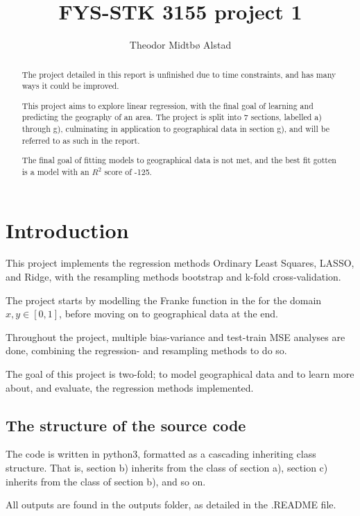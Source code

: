 \documentclass[a4paper, UKenglish]{article}
\newcommand{\0}{\mathbf{0}}
\newcommand{\1}{\mathbf{1}}
\begin{document}
\title{FYS-STK 3155 project 1}
\author{Theodor Midtbø Alstad}
\maketitle

\begin{abstract}
The project detailed in this report is unfinished due to time constraints, and has many ways it could be improved.

This project aims to explore linear regression, with the final goal of learning and predicting the geography of an area. The project is split into 7 sections, labelled a) through g), culminating in application to geographical data in section g), and will be referred to as such in the report. 

The final goal of fitting models to geographical data is not met, and the best fit gotten is a model with an $R^2$ score of -125.


\end{abstract}

\section{Introduction}
This project implements the regression methods Ordinary Least Squares, LASSO, and Ridge, with the resampling methods bootstrap and k-fold cross-validation.

The project starts by modelling the Franke function in the for the domain $x,y \in [0,1]$, before moving on to geographical data at the end.

Throughout the project, multiple bias-variance and test-train MSE analyses are done, combining the regression- and resampling methods to do so. 

The goal of this project is two-fold; to model geographical data and to learn more about, and evaluate, the regression methods implemented.
  
  
\subsection{The structure of the source code}
The code is written in python3, formatted as a cascading inheriting class structure. That is, section b) inherits from the class of section a), section c) inherits from the class of section b), and so on.

All outputs are found in the outputs folder, as detailed in the .README file.
\end{document}
